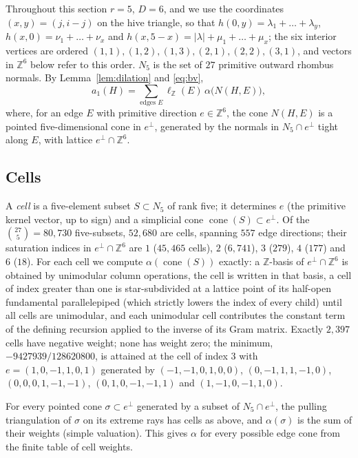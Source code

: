 \documentclass[11pt]{amsart}
\theoremstyle{definition}
\DeclareMathOperator{\cone}{cone}
\newcommand{\Z}{\mathbb{Z}}
\newcommand{\lam}{\lambda}
\begin{document}
Throughout this section $r=5$, $D=6$, and we use the coordinates
$(x,y)=(j,i-j)$ on the hive triangle, so that $h(0,y)=\lam_1+\dots+\lam_y$,
$h(x,0)=\nu_1+\dots+\nu_x$ and $h(x,5-x)=|\lam|+\mu_1+\dots+\mu_x$; the six
interior vertices are ordered $(1,1),(1,2),(1,3),(2,1),(2,2),(3,1)$, and vectors
in $\Z^{6}$ below refer to this order. $N_5$ is the set of $27$ primitive
outward rhombus normals. By Lemma~\ref{lem:dilation} and \eqref{eq:bv},
\begin{equation}\label{eq:edgeformula}
  a_1(H)=\sum_{\text{edges }E}\ell_{\Z}(E)\,\alpha\bigl(N(H,E)\bigr),
\end{equation}
where, for an edge $E$ with primitive direction $e\in\Z^{6}$, the cone $N(H,E)$
is a pointed five-dimensional cone in $e^{\perp}$, generated by the normals in
$N_5\cap e^{\perp}$ tight along $E$, with lattice $e^{\perp}\cap\Z^{6}$.

\subsection{Cells}\label{sec:cells}
A \emph{cell} is a five-element subset $S\subset N_5$ of rank five; it
determines $e$ (the primitive kernel vector, up to sign) and a simplicial cone
$\cone(S)\subset e^{\perp}$. Of the $\binom{27}{5}=80{,}730$ five-subsets,
$52{,}680$ are cells, spanning $557$ edge directions; their saturation indices
in $e^{\perp}\cap\Z^{6}$ are $1$ ($45{,}465$ cells), $2$ ($6{,}741$), $3$
($279$), $4$ ($177$) and $6$ ($18$). For each cell we compute $\alpha(\cone(S))$
exactly: a $\Z$-basis of $e^{\perp}\cap\Z^{6}$ is obtained by unimodular column
operations, the cell is written in that basis, a cell of index greater than one
is star-subdivided at a lattice point of its half-open fundamental
parallelepiped (which strictly lowers the index of every child) until all cells
are unimodular, and each unimodular cell contributes the constant term of the
defining recursion applied to the inverse of its Gram matrix. Exactly
$2{,}397$ cells have negative weight; none has weight zero; the minimum,
$-9427939/128620800$, is attained at the cell of index $3$ with
$e=(1,0,-1,1,0,1)$ generated by $(-1,-1,0,1,0,0)$, $(0,-1,1,1,-1,0)$,
$(0,0,0,1,-1,-1)$, $(0,1,0,-1,-1,1)$ and $(1,-1,0,-1,1,0)$.

For every pointed cone $\sigma\subset e^{\perp}$ generated by a subset of
$N_5\cap e^{\perp}$, the pulling triangulation of $\sigma$ on its extreme rays
has cells as above, and $\alpha(\sigma)$ is the sum of their weights (simple
valuation). This gives $\alpha$ for every possible edge cone from the finite
table of cell weights.
\end{document}
